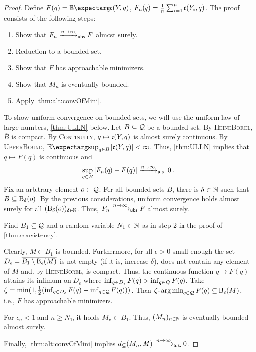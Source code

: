 \begin{proof}
Define $F(q) = \Ex{\mf c(Y, q)}$, $F_n(q) = \frac1n\sum_{i=1}^n \mathfrak{c}(Y_i, q)$.  The proof consists of the following steps:
\begin{enumerate}
\item Show that $F_n \xrightarrow{n\to\infty}_{\mathsf{ubs}} F$ almost surely.
\item Reduction to a bounded set.
\item Show that $F$ has approachable minimizers.
\item Show that $M_n$ is eventually bounded.
\item Apply \autoref{thm:alt:convOfMini}.
\end{enumerate}
%
\underline{}
To show uniform convergence on bounded sets, we will use the uniform law of large numbers, \autoref{thm:ULLN} below.
Let $B\subseteq\mathcal{Q}$ be a bounded set.
By \textsc{HeineBorel}, $\overline{B}$ is compact.
By \textsc{Continuity}, $q \mapsto \mathfrak{c}(Y, q)$ is almost surely continuous.
By \textsc{UpperBound}, $\Ex{ \sup_{q\in B}\abs{\mf c(Y, q)}} < \infty$. Thus, \autoref{thm:ULLN} implies that $q \mapsto F(q)$ is continuous and
\begin{equation*}
	\sup_{q\in B}  \left| F_n(q)-F(q) \right| \xrightarrow{n\to\infty}_{\mathsf{a.s.}}0
	\, .
\end{equation*}
Fix an arbitrary element $o\in\mathcal{Q}$. For all bounded sets $B$, there is $\delta \in\mathbb{N}$ such that $B \subseteq \operatorname{\mathrm{B}}_\delta(o)$. By the previous considerations, uniform convergence holds almost surely for all $(\operatorname{\mathrm{B}}_{\delta}(o))_{\delta\in\mathbb{N}}$.
Thus, $F_n \xrightarrow{n\to\infty}_{\mathsf{ubs}} F$ almost surely.

%
\noindent
\underline{}
Find $B_1\subseteq\mathcal{Q}$ and a random variable $N_1\in\mathbb{N}$ as in step 2 in the proof of \autoref{thm:consistency}.

%
\noindent
\underline{}
Clearly, $M \subset B_1$ is bounded. Furthermore, for all $\epsilon > 0$ small enough the set $D_\epsilon = \overline{B_1 \setminus \operatorname{\mathrm{B}}_\epsilon(M)}$ is not empty (if it is, increase $\delta$), does not contain any element of $M$ and, by \textsc{HeineBorel}, is compact. Thus, the continuous function $q\mapsto F(q)$ attains its infimum on $D_\epsilon$ where $\inf_{q\in D_\epsilon} F(q) > \inf_{q\in \mathcal{Q}} F(q)$. Take $\zeta = \min(1, \frac12(\inf_{q\in D_\epsilon} F(q) - \inf_{q\in \mathcal{Q}} F(q)))$. Then $\zeta\text{-}\operatorname*{arg\,min}_{q\in\mathcal{Q}} F(q) \subseteq \operatorname{\mathrm{B}}_\epsilon(M)$, i.e., $F$ has approachable minimizers. 

%
\noindent
\underline{}
For $\epsilon_n < 1$ and $n \geq N_1$, it holds $M_n \subset B_1$. Thus, $(M_n)_{n\in\mathbb{N}}$ is eventually bounded almost surely.

%
\noindent
\underline{}
Finally, \autoref{thm:alt:convOfMini} implies $d_\subseteq(M_n, M) \xrightarrow{n\to\infty}_{\mathsf{a.s.}} 0$.
\end{proof}
%
